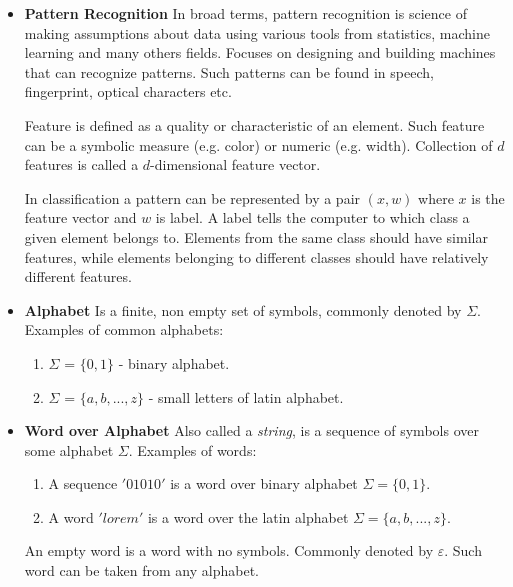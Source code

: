 \documentclass{article}
\begin{document}
\begin{itemize}

\item  {\bf Pattern Recognition}
In broad terms, pattern recognition is science of making assumptions about data using various tools from statistics, machine learning and many others fields.
Focuses on designing and building machines that can recognize patterns. Such patterns can be found in speech, fingerprint, optical characters etc.

Feature is defined as a quality or characteristic of an element.
Such feature can be a symbolic measure (e.g. color) or numeric (e.g. width).
Collection of $d$ features is called a $d$-dimensional feature vector.

In classification a pattern can be represented by a pair $(x,w)$ where $x$ is the feature vector and $w$ is label. A label tells the computer to which class a given element belongs to. Elements from the same class should have similar features, while elements belonging to different classes should have relatively different features.


\item {\bf Alphabet}
Is a finite, non empty set of symbols, commonly denoted by $\Sigma$.
Examples of common alphabets:
\begin{enumerate}
	\item $\Sigma$ = $\{0 ,1 \}$ - binary alphabet.
	\item $\Sigma$ = $\{a, b, ..., z\}$ - small letters of latin alphabet.
\end{enumerate}


\item {\bf Word over Alphabet}
Also called a \textit{string}, is a sequence of symbols over some alphabet $\Sigma$.
Examples of words:
\begin{enumerate}
	\item A sequence $'01010'$ is a word over binary alphabet $\Sigma=\{0,1\}$.
	\item A word $'lorem'$ is a word over the latin alphabet $\Sigma=\{a, b, ..., z\}$.
\end{enumerate}

An empty word is a word with no symbols. Commonly denoted by $\varepsilon$. Such word can be taken from any alphabet.


\end{itemize}
\end{document}

